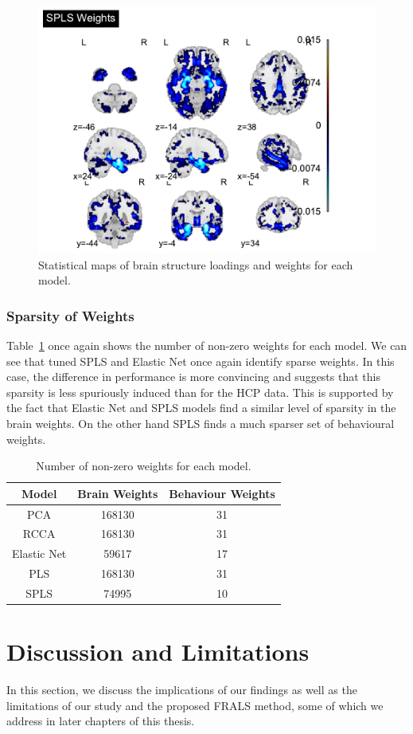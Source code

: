 \begin{figure}
\includegraphics[width=0.45\linewidth]{figures/adni/SPLS brain weights mosaic}
\caption{Statistical maps of brain structure loadings and weights for each model.}
\end{figure}

\subsubsection{Sparsity of Weights}

Table~\ref{tab:brain-behaviour-weights-adni} once again shows the number of non-zero weights for each model.
We can see that tuned SPLS and Elastic Net once again identify sparse weights.
In this case, the difference in performance is more convincing and suggests that this sparsity is less spuriously induced than for the HCP data.
This is supported by the fact that Elastic Net and SPLS models find a similar level of sparsity in the brain weights.
On the other hand SPLS finds a much sparser set of behavioural weights.

\begin{table}[h]
\centering
\caption{Number of non-zero weights for each model.}
\begin{tabular}{|c|c|c|}
\hline
Model & Brain Weights & Behaviour Weights \\
\hline
PCA & 168130 & 31 \\
RCCA & 168130 & 31 \\
Elastic Net & 59617 & 17 \\
PLS & 168130 & 31 \\
SPLS & 74995 & 10 \\
\hline
\end{tabular}\label{tab:brain-behaviour-weights-adni}
\end{table}

\section{Discussion and Limitations}

In this section, we discuss the implications of our findings as well as the limitations of our study and the proposed FRALS method, some of which we address in later chapters of this thesis.

